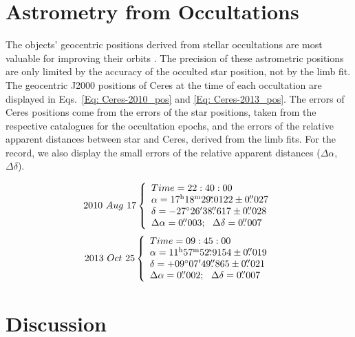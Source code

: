 \documentclass[useAMS,usenatbib]{mn2e}
\begin{document}
\section{Astrometry from Occultations}

The objects' geocentric positions derived from stellar occultations are most valuable for improving their orbits \citep{Desmars2015}. The precision of these astrometric positions are only limited by the accuracy of the occulted star position, not by the limb fit. The geocentric J2000 positions of Ceres at the time of each occultation are displayed in Eqs.~\ref{Eq: Ceres-2010_pos} and \ref{Eq: Ceres-2013_pos}. The errors of Ceres positions come from the errors of the star positions, taken from the respective catalogues for the occultation epochs, and the errors of the relative apparent distances between star and Ceres, derived from the limb fits. For the record, we also display the small errors of the relative apparent distances ($\Delta\alpha$, $\Delta\delta$).

\begin{equation}
2010 ~ Aug ~ 17
\left\{
 \begin{array}{l l}
    Time = 22:40:00\\
    \alpha = 17^{\rmn{h}}18^{\rmn{m}}29\fs0122\pm0\farcs027\\
    \delta = -27\degr 26\arcmin 38\farcs617\pm0\farcs028\\
    \Delta\alpha = 0\farcs003; ~~\Delta\delta = 0\farcs007
  \end{array}
\right.
\label{Eq: Ceres-2010_pos}
\end{equation}
\begin{equation}
2013 ~ Oct ~ 25
\left\{
  \begin{array}{l l}
    Time = 09:45:00\\
    \alpha = 11^{\rmn{h}}57^{\rmn{m}}52\fs9154\pm0\farcs019\\
    \delta = +09\degr 07\arcmin 49\farcs865\pm0\farcs021\\
    \Delta\alpha = 0\farcs002; ~~\Delta\delta = 0\farcs007
  \end{array}
\right.
\label{Eq: Ceres-2013_pos}
\end{equation}




\section{Discussion}
\end{document}
